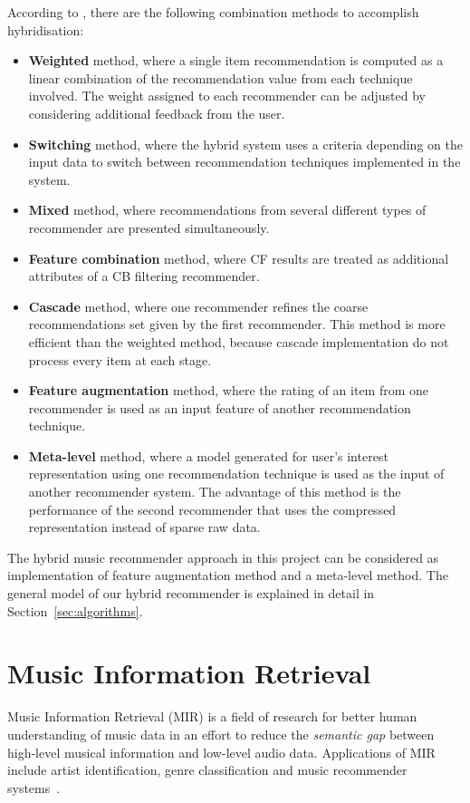 According to \textcite{Burke2002331}, there are the following combination methods to accomplish hybridisation:
\begin{itemize}
	\item \textbf{Weighted} method, where a single item recommendation is computed as a linear combination of the recommendation value from each technique involved. The weight assigned to each recommender can be adjusted by considering additional feedback from the user.
	\item \textbf{Switching} method, where the hybrid system uses a criteria depending on the input data to switch between recommendation techniques implemented in the system.
	\item \textbf{Mixed} method, where recommendations from several different types of recommender are presented simultaneously.
	\item \textbf{Feature combination} method, where CF results are treated as additional attributes of a CB filtering recommender.
	\item \textbf{Cascade} method, where one recommender refines the coarse recommendations set given by the first recommender. This method is more efficient than the weighted method, because cascade implementation do not process every item at each stage.
	\item \textbf{Feature augmentation} method, where the rating of an item from one recommender is used as an input feature of another recommendation technique.
	\item \textbf{Meta-level} method, where a model generated for user's interest representation using one recommendation technique is used as the input of another recommender system. The advantage of this method is the performance of the second recommender that uses the compressed representation instead of sparse raw data.
\end{itemize}

The hybrid music recommender approach in this project can be considered as implementation of feature augmentation method and a meta-level method. The general model of our hybrid recommender is explained in detail in Section~\ref{sec:algorithms}.


\section{Music Information Retrieval}
Music Information Retrieval (MIR) \parencite{Casey2008668} is a field of research for better human understanding of music data in an effort to reduce the \textit{semantic gap} \parencite{Celma2006} between high-level musical information and low-level audio data. Applications of MIR include artist identification, genre classification and music recommender systems~\parencite{weston2012latent,Yoshii2008435}.

